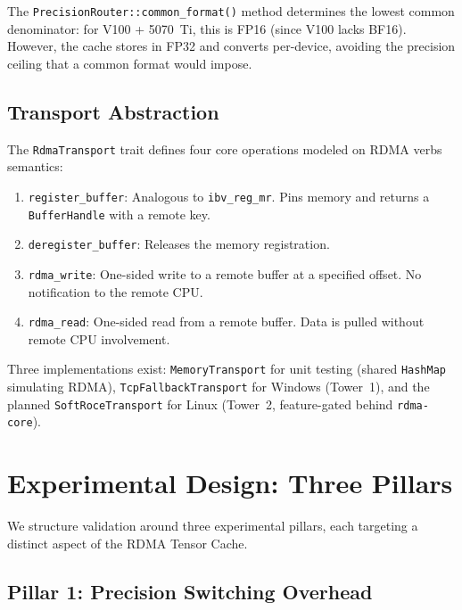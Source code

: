 \documentclass[11pt,letterpaper]{article}
\theoremstyle{definition}
\begin{document}
The \texttt{PrecisionRouter::common\_format()} method determines the lowest common denominator: for V100 + 5070~Ti, this is FP16 (since V100 lacks BF16). However, the cache stores in FP32 and converts per-device, avoiding the precision ceiling that a common format would impose.

\subsection{Transport Abstraction}

The \texttt{RdmaTransport} trait defines four core operations modeled on RDMA verbs semantics:

\begin{enumerate}
    \item \texttt{register\_buffer}: Analogous to \texttt{ibv\_reg\_mr}. Pins memory and returns a \texttt{BufferHandle} with a remote key.
    \item \texttt{deregister\_buffer}: Releases the memory registration.
    \item \texttt{rdma\_write}: One-sided write to a remote buffer at a specified offset. No notification to the remote CPU.
    \item \texttt{rdma\_read}: One-sided read from a remote buffer. Data is pulled without remote CPU involvement.
\end{enumerate}

Three implementations exist: \texttt{MemoryTransport} for unit testing (shared \texttt{HashMap} simulating RDMA), \texttt{TcpFallbackTransport} for Windows (Tower~1), and the planned \texttt{SoftRoceTransport} for Linux (Tower~2, feature-gated behind \texttt{rdma-core}).

\section{Experimental Design: Three Pillars}
\label{sec:experiments}

We structure validation around three experimental pillars, each targeting a distinct aspect of the RDMA Tensor Cache.

\subsection{Pillar 1: Precision Switching Overhead}
\end{document}
